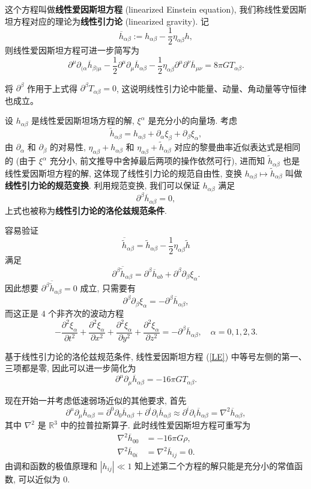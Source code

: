 这个方程叫做{\bf 线性爱因斯坦方程} (linearized Einstein equation), 我们称线性爱因斯坦方程对应的理论为{\bf 线性引力论} (linearized gravity). 记 
\[ \overline{h}_{\alpha\beta}:=h_{\alpha\beta}-\frac{1}{2}\eta_{\alpha\beta}h, \]
则线性爱因斯坦方程可进一步简写为
\[ \label{LE}\partial^{\mu}\partial_{(\alpha}\overline{h}_{\beta)\mu}-\frac{1}{2}\partial^\mu\partial_\mu\overline{h}_{\alpha\beta}-\frac{1}{2}\eta_{\alpha\beta}\partial^{\mu}\partial^{\nu}\overline{h}_{\mu\nu}=8\pi GT_{\alpha\beta}.\tag{LE} \] 
\begin{remark}
	将 $\partial^{\beta}$ 作用于上式得 $\partial^{\beta}T_{\alpha\beta}=0$, 这说明线性引力论中能量、动量、角动量等守恒律也成立。
\end{remark}

设 $h_{\alpha\beta}$ 是线性爱因斯坦场方程的解, $\xi^{\alpha}$ 是充分小的向量场. 考虑
\[ \tilde{h}_{\alpha\beta}=h_{\alpha\beta}+\partial_\alpha\xi_{\beta}+\partial_\beta\xi_{\alpha}, \]
由 $\partial_\alpha$ 和 $\partial_\beta$ 的对易性, $\eta_{\alpha\beta}+h_{\alpha\beta}$ 和 $\eta_{\alpha\beta}+\tilde{h}_{\alpha\beta}$ 对应的黎曼曲率近似表达式是相同的 (由于 $\xi^{\alpha}$ 充分小, 前文推导中舍掉最后两项的操作依然可行), 进而知 $\tilde{h}_{\alpha\beta}$ 也是线性爱因斯坦方程的解, 这体现了线性引力论的规范自由性, 变换 $h_{\alpha\beta}\mapsto\tilde{h}_{\alpha\beta}$ 叫做{\bf 线性引力论的规范变换}. 利用规范变换, 我们可以保证 $h_{\alpha\beta}$ 满足
\[ \partial^\beta\overline{h}_{\alpha\beta}=0, \] 
上式也被称为{\bf 线性引力论的洛伦兹规范条件}. 
\begin{remark}
	容易验证
	\[ \overline{\tilde{h}}_{\alpha\beta}=\tilde{h}_{\alpha\beta}-\frac{1}{2}\eta_{\alpha\beta}\tilde{h} \]
	满足
	\[ \partial^\beta\overline{\tilde{h}}_{\alpha\beta}=\partial^{\beta}\overline{h}_{ab}+\partial^\beta\partial_\beta\xi_\alpha. \]
	因此想要 $\partial^\beta\overline{\tilde{h}}_{\alpha\beta}=0$ 成立, 只需要有
	\[ \partial^{\beta}\partial_{\beta}\xi_\alpha=-\partial^{\beta}\overline{h}_{\alpha\beta}, \]
	而这正是 $4$ 个非齐次的波动方程
	\[ -\frac{\partial^2\xi_\alpha}{\partial t^2}+\frac{\partial^2\xi_\alpha}{\partial x^2}+\frac{\partial^2\xi_\alpha}{\partial y^2}+\frac{\partial^2\xi_\alpha}{\partial z^2}=-\partial^{\beta}\overline{h}_{\alpha\beta},\quad \alpha=0,1,2,3. \]
\end{remark}
基于线性引力论的洛伦兹规范条件, 线性爱因斯坦方程 (\ref{LE}) 中等号左侧的第一、三项都是零, 因此可以进一步简化为
\[ \partial^{\mu}\partial_{\mu}\overline{h}_{\alpha\beta}=-16\pi GT_{\alpha\beta}. \] 

现在开始一并考虑低速弱场近似的其他要求, 首先
\[ \partial^{\mu}\partial_{\mu}\overline{h}_{\alpha\beta}=\partial^0\partial_0\overline{h}_{\alpha\beta}+\partial^{i}\partial_{i}\overline{h}_{\alpha\beta}\approx\partial^{i}\partial_{i}\overline{h}_{\alpha\beta}=\nabla^2\overline{h}_{\alpha\beta}, \] 
其中 $\nabla^2$ 是 $\mathbb{R}^3$ 中的拉普拉斯算子. 此时线性爱因斯坦方程可重写为
\begin{align*}
	\nabla^2\overline{h}_{00}&=-16\pi G\rho,\\
	\nabla^2\overline{h}_{0i}&=\nabla^2\overline{h}_{ij}=0.
\end{align*}
由调和函数的极值原理和 $|h_{ij}|\ll 1$ 知上述第二个方程的解只能是充分小的常值函数, 可以近似为 $0$. 

